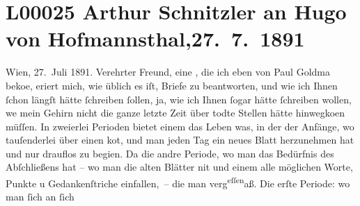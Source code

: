 

\section[Arthur Schnitzler an Hugo von Hofmannsthal, 27. 7. 1891]{L00025 Arthur Schnitzler an Hugo von Hofmannsthal,27. 7. 1891}
\nopagebreak{}
\rehead{ }\normalsize\beginnumbering{}
\toendnotes[C]{\smallbreak\pagebreak[2]}
\toendnotes[C]{\smallbreak}
\pstart
           \raggedleft{}{\pb}Wien, 27. Juli 1891.\pend
           \vspace{0.5em}
\pstart
           Verehrter Freund, eine \label{K_L00025-1v}\label{K_L00025-1}, die ich eben von Paul Goldma{\geminationn} beko{\geminationm}e, eri{\geminationn}ert mich,
               wie üblich es iſt, Briefe zu beantworten, und wie ich Ihnen{ }ſchon längſt hätte{ }ſchreiben{ }ſollen, ja, wie ich Ihnen{ }ſogar hätte{ }ſchreiben wollen, we{\geminationn} mein Gehirn nicht die ganze letzte Zeit über todte
               Stellen hätte hinwegko{\geminationm}en müſſen. In zweierlei Perioden
               bietet einem das Leben was, in der der Anfänge, wo tauſenderlei über einen ko{\geminationm}t, und man {\pb}jeden Tag ein
               neues Blatt herzunehmen hat und nur drauflos zu begi{\geminationn}en.
                  Da{\geminationn} die andre Periode, wo man das Bedürfnis des
               Abſchließens hat – wo man die alten Blätter ni{\geminationm}t und
               einem alle möglichen Worte, Punkte u Gedankenſtriche einfallen, – die man verg\substVorne{}\textsuperscript{eſſen}\substDazwischen{}aß\substHinten{}{ }. Die erſte Periode: wo man{ }ſich an{ }ſich
